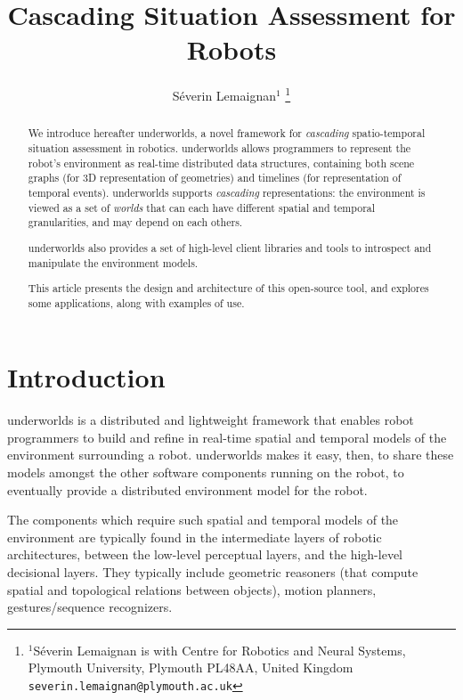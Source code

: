 \documentclass[letterpaper, 10 pt, conference]{ieeeconf}  %
\title{\LARGE \bf
Cascading Situation Assessment for Robots
}
\author{Séverin Lemaignan$^{1}$%
\thanks{$^{1}$Séverin Lemaignan is with Centre for Robotics and Neural Systems,
        Plymouth University, Plymouth PL48AA, United Kingdom
        {\tt\small severin.lemaignan@plymouth.ac.uk}}%
}
\newcommand{\uwds}{{\sc underworlds}\xspace}
\begin{document}
\maketitle
\thispagestyle{empty}
\pagestyle{empty}


\begin{abstract}

    We introduce hereafter \uwds, a novel framework for \emph{cascading}
    spatio-temporal situation assessment in robotics. \uwds allows programmers
    to represent the robot's environment as real-time distributed data
    structures, containing both scene graphs (for 3D representation of geometries)
    and timelines (for representation of temporal events). \uwds supports
    \emph{cascading} representations: the environment is viewed as a set of
    \emph{worlds} that can each have different spatial and temporal
    granularities, and may depend on each others.
    
    \uwds also provides a set of high-level client libraries and tools to introspect
    and manipulate the environment models.

    This article presents the design and architecture of this open-source tool,
    and explores some applications, along with examples of use.

\end{abstract}


\section{Introduction}


\uwds is a distributed and lightweight framework that enables robot programmers
to build and refine in real-time spatial and temporal models of the environment
surrounding a robot. \uwds makes it easy, then, to share these models amongst
the other software components running on the robot, to eventually provide a
distributed environment model for the robot.

The components which require such spatial and temporal models of the environment
are typically found in the intermediate layers of robotic architectures, between
the low-level perceptual layers, and the high-level decisional layers. They
typically include geometric reasoners (that compute spatial and topological
relations between objects), motion planners, gestures/sequence recognizers.
\end{document}
